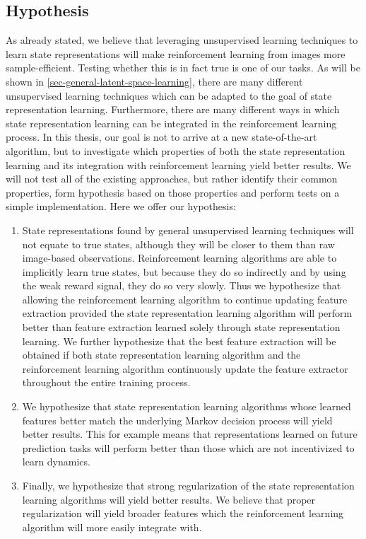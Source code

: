 \subsection{Hypothesis}
\label{subsec-hypothesis}
As already stated, we believe that leveraging unsupervised learning techniques
to learn state representations will make reinforcement learning from images
more sample-efficient.
Testing whether this is in fact true is one of our tasks.
As will be shown in \ref{sec-general-latent-space-learning}, there are many different unsupervised learning
techniques which can be adapted to the goal of state representation learning.
Furthermore, there are many different ways in which state representation learning can be integrated
in the reinforcement learning process.
In this thesis, our goal is not to arrive at a new state-of-the-art algorithm,
but to investigate which properties of both the state representation learning and its integration
with reinforcement learning yield better results.
We will not test all of the existing approaches, but rather identify their common properties,
form hypothesis based on those properties and perform tests on a simple implementation.
Here we offer our hypothesis:
\begin{enumerate}
		\item State representations found by general unsupervised learning techniques 
		will not equate to true states, although they will be closer to them than
		raw image-based observations. Reinforcement learning algorithms are able
		to implicitly learn true states, but because they do so indirectly and by using
		the weak reward signal, they do so very slowly.
		Thus we hypothesize that allowing the reinforcement learning algorithm to continue updating
		feature extraction provided the state representation learning algorithm will perform better
		than feature extraction learned solely through state representation learning.
		We further hypothesize that the best feature extraction will be obtained if both
		state representation learning algorithm and the reinforcement learning algorithm 
		continuously update the feature extractor throughout the entire training process.
		\label{parallel-training-hypothesis}
\item We hypothesize that state representation learning algorithms whose learned features better match the underlying
		Markov decision process will yield better results.
		This for example means that representations learned on future prediction tasks will
		perform better than those which are not incentivized to learn dynamics.
		\label{good-features-hypothesis}
\item Finally, we hypothesize that strong regularization of the state representation learning
		algorithms will yield better results. We believe that proper regularization will
		yield broader features which the reinforcement learning algorithm will 
		more easily integrate with.
		\label{regularization-hypothesis}
\end{enumerate}




